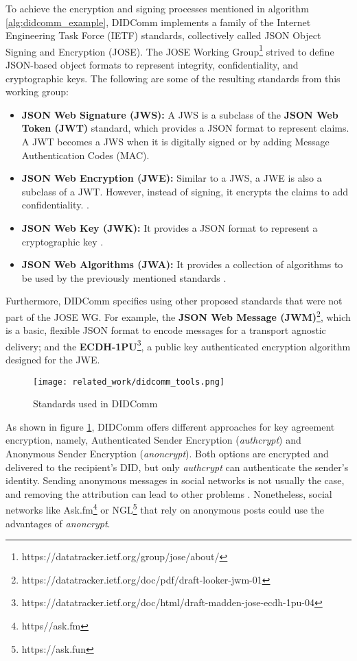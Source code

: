 To achieve the encryption and signing processes mentioned in algorithm \ref{alg:didcomm_example}, DIDComm implements a family of the Internet Engineering Task Force (IETF) standards, collectively called JSON Object Signing and Encryption (JOSE). The JOSE Working Group\footnote{https://datatracker.ietf.org/group/jose/about/} strived to define JSON-based object formats to represent integrity, confidentiality, and cryptographic keys. The following are some of the resulting standards from this working group: 

\begin{itemize}
  \item \textbf{JSON Web Signature (JWS):}  A JWS is a subclass of the \textbf{JSON Web Token (JWT)} standard, which provides a JSON format to represent claims. A JWT becomes a JWS when it is digitally signed or by adding Message Authentication Codes (MAC)\cite{jones_bradley_sakimura_2015}.
  \item \textbf{JSON Web Encryption (JWE):} Similar to a JWS, a JWE is also a subclass of a JWT. However, instead of signing, it encrypts the claims to add confidentiality. \cite{jones_hildebrand_2015}.
  \item \textbf{JSON Web Key (JWK):} It provides a JSON format to represent a cryptographic key \cite{jones_2015}.
  \item \textbf{JSON Web Algorithms (JWA):} It provides a collection of algorithms to be used by the previously mentioned standards \cite{jones_2_2015}.
\end{itemize}

Furthermore, DIDComm specifies using other proposed standards that were not part of the JOSE WG. For example, the \textbf{JSON Web Message (JWM)}\footnote{https://datatracker.ietf.org/doc/pdf/draft-looker-jwm-01}, which is a basic, flexible JSON format to encode messages for a transport agnostic delivery; and the \textbf{ECDH-1PU}\footnote{https://datatracker.ietf.org/doc/html/draft-madden-jose-ecdh-1pu-04}, a public key authenticated encryption algorithm designed for the JWE. 

\begin{figure}[H]
  \centering
  \texttt{[image: related\_work/didcomm\_tools.png]}
  \caption{Standards used in DIDComm}
  \label{fig:didcomm_tools}
\end{figure}

As shown in figure \ref{fig:didcomm_tools}, DIDComm offers different approaches for key agreement encryption, namely, Authenticated Sender Encryption (\emph{authcrypt}) and Anonymous Sender Encryption (\emph{anoncrypt}). Both options are encrypted and delivered to the recipient's DID, but only \emph{authcrypt} can authenticate the sender's identity. Sending anonymous messages in social networks is not usually the case, and removing the attribution can lead to other problems \cite{martin_2022}. Nonetheless, social networks like Ask.fm\footnote{https//ask.fm} or NGL\footnote{https://ask.fun} that rely on anonymous posts could use the advantages of \emph{anoncrypt}.

